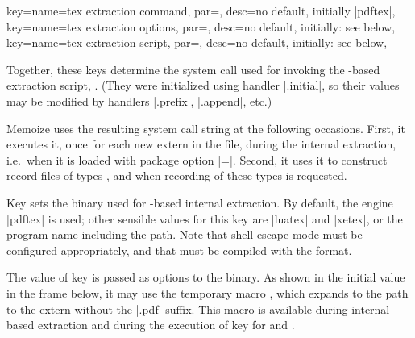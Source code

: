 \documentclass[a4paper,11pt]{article}
\begin{document}
\begin{doc}{
    key={name=tex extraction command, par=,
      desc={no default, initially |pdftex|}},
    key={name=tex extraction options, par=,
      desc={no default, initially: see below}},
    key={name=tex extraction script, par=,
      desc={no default, initially: see below}},
  }
  
  Together, these keys determine the system call used for invoking the
  -based extraction script, .
  (They were initialized using  handler |.initial|, so their
  values may be modified by handlers |.prefix|, |.append|, etc.)

  Memoize uses the resulting system call string at the following occasions.
  First, it executes it, once for each new extern in the \dmmz file, during the
  internal extraction, i.e.\ when it is loaded with package option
  |=|.  Second, it uses it to construct
  record files of types ,  and
   when recording of these types is requested.
  
  Key  sets the  binary used for
  -based internal extraction.  By default, the 
  engine |pdftex| is used; other sensible values for this key are |luatex| and
  |xetex|, or the program name including the path.  Note that shell escape mode
  must be configured appropriately, and that
   must be compiled with the
   format.

  The value of key  is passed as options to the
   binary.  As shown in the initial value in the frame below,
  it may use the temporary macro , which expands to
  the path to the extern without the |.pdf| suffix.  This macro is available
  during internal -based extraction and during the execution of
   key for and .



\end{doc}
\end{document}
